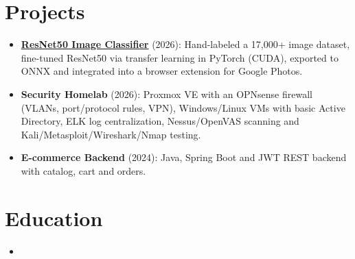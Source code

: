 \documentclass[11pt,a4paper,sans]{moderncv}
\begin{document}

\section{Projects}
\vspace{1pt}
\begin{itemize}
\item{\textbf{\href{https://github.com/Pidual/Photo-Deletor-Extension}{ResNet50 Image Classifier}} (2026): Hand-labeled a 17,000+ image dataset, fine-tuned ResNet50 via transfer learning in PyTorch (CUDA), exported to ONNX and integrated into a browser extension for Google Photos.}
\item{\textbf{Security Homelab} (2026): Proxmox VE with an OPNsense firewall (VLANs, port/protocol rules, VPN), Windows/Linux VMs with basic Active Directory, ELK log centralization, Nessus/OpenVAS scanning and Kali/Metasploit/Wireshark/Nmap testing.}
\item{\textbf{E-commerce Backend} (2024): Java, Spring Boot and JWT REST backend with catalog, cart and orders.}
\end{itemize}


\section{Education}
\vspace{1pt}
\begin{itemize}

\item{}

\end{itemize}

\end{document}
